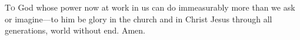 
\lettrine{T}{o} God whose power now at work in us can do immeasurably more than we ask or imagine—to him be glory in the church and in Christ Jesus through all generations, world without end. Amen.
